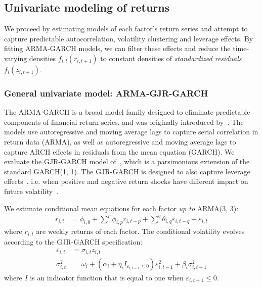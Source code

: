 
\subsection{Univariate modeling of returns} %
\label{sub:univariate_modeling_of_returns}

We proceed by estimating models of each factor's return series and attempt to capture predictable autocorrelation, volatility clustering and leverage effects. By fitting ARMA-GARCH models, we can filter these effects and reduce the time-varying densities $f_{i,t}(r_{i,t+1})$ to constant densities of \emph{standardized residuals} $f_{i}(z_{i,t+1})$.

\subsubsection{General univariate model: ARMA-GJR-GARCH}

The ARMA-GARCH is a broad model family designed to eliminate predictable components of financial return series, and was originally introduced by~\textcite{Bollerslev1986}. The models use autoregressive and moving average lags to capture serial correlation in return data (ARMA), as well as autoregressive and moving average lags to capture ARCH effects in residuals from the mean equation (GARCH). We evaluate the GJR-GARCH model of~\textcite{glosten1993relation}, which is a parsimonious extension of the standard GARCH(1, 1). The GJR-GARCH is designed to also capture leverage effects~\autocite{glosten1993relation}, i.e. when positive and negative return shocks have different impact on future volatility~\autocite{Black1976}.

We estimate conditional mean equations for each factor \emph{up to} ARMA(3, 3):
\begin{align}
  r_{i,t} &=
    \phi_{i,0} +
    \sum^p \phi_{i,p} r_{i,t - p} +
    \sum^q \theta_{i,q} \varepsilon_{i,t - q} + 
    \varepsilon_{i,t}
    \label{eq:garch_mean}
\end{align}
where $r_{i,t}$ are weekly returns of each factor. The conditional volatility evolves according to the GJR-GARCH specification:
\begin{align}
  \varepsilon_{i,t} &= \sigma_{i,t} z_{i,t} \\
  \sigma_{i,t}^2 &=
    \omega_i +
    (\alpha_i + \eta_i I_{\varepsilon_{i,t-1} \leq 0}) \varepsilon_{i,t - 1}^2 +
    \beta_{i} \sigma^2_{i,t - 1}
    \label{eq:garch_garch}
\end{align}
where $I$ is an indicator function that is equal to one when $\varepsilon_{i,t-1} \leq 0$. 

